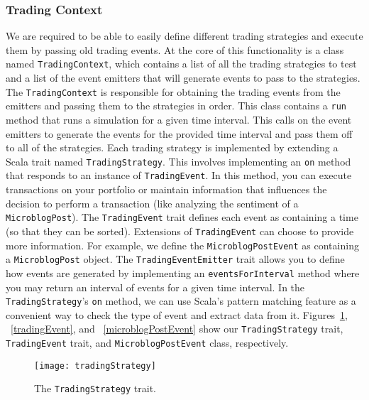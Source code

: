 \subsubsection{Trading Context}

We are required to be able to easily define different trading strategies and execute them by passing old trading events.
At the core of this functionality is a class named \texttt{TradingContext}, which contains a list of all the trading strategies to test and a list of the event emitters that will generate events to pass to the strategies.
The \texttt{TradingContext} is responsible for obtaining the trading events from the emitters and passing them to the strategies in order.
This class contains a \texttt{run} method that runs a simulation for a given time interval.
This calls on the event emitters to generate the events for the provided time interval and pass them off to all of the strategies.
Each trading strategy is implemented by extending a Scala trait named \texttt{TradingStrategy}.
This involves implementing an \texttt{on} method that responds to an instance of \texttt{TradingEvent}.
In this method, you can execute transactions on your portfolio or maintain information that influences the decision to perform a transaction (like analyzing the sentiment of a \texttt{MicroblogPost}).
The \texttt{TradingEvent} trait defines each event as containing a time (so that they can be sorted).
Extensions of \texttt{TradingEvent} can choose to provide more information.
For example, we define the \texttt{MicroblogPostEvent} as containing a \texttt{MicroblogPost} object.
The \texttt{TradingEventEmitter} trait allows you to define how events are generated by implementing an \texttt{eventsForInterval} method where you may return an interval of events for a given time interval.
In the \texttt{TradingStrategy}'s \texttt{on} method, we can use Scala's pattern matching feature as a convenient way to check the type of event and extract data from it.
Figures~\ref{tradingStrategy}, ~\ref{tradingEvent}, and ~\ref{microblogPostEvent} show our \texttt{TradingStrategy} trait, \texttt{TradingEvent} trait, and \texttt{MicroblogPostEvent} class, respectively.

\begin{figure}[h]
  \label{tradingStrategy}
  \begin{center}
    \texttt{[image: tradingStrategy]}
  \end{center}
  \caption{The \texttt{TradingStrategy} trait.}
\end{figure}

